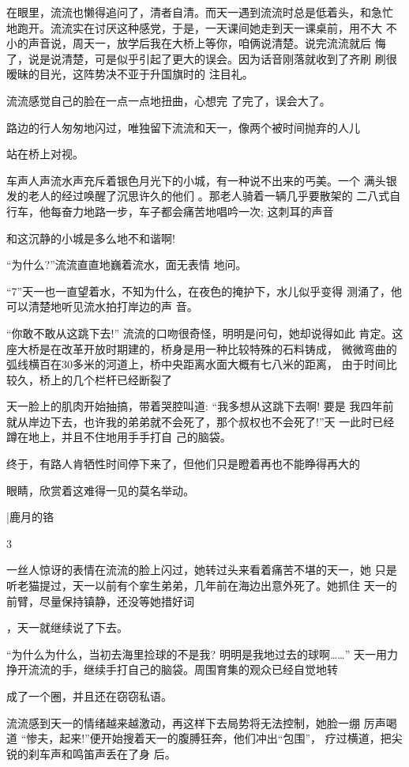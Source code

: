 \documentclass{article}
\begin{document}
在眼里，流流也懒得追问了，清者自清。而天一遇到流流时总是低着头，和急忙
地跑开。流流实在讨厌这种感党，于是，一天课间她走到天一课桌前，用不大
不小的声音说，周天一，放学后我在大桥上等你，咱俩说清楚。说完流流就后
悔了，说是说清楚，可是似乎引起了更大的误会。因为话音刚落就收到了齐刷
刷很暧昧的目光，这阵势决不亚于升国旗时的
注目礼。 

流流感觉自己的脸在一点一点地扭曲，心想完
了完了，误会大了。 

路边的行人匆匆地闪过，唯独留下流流和天一，像两个被时间抛弃的人儿

站在桥上对视。 

车声人声流水声充斥着银色月光下的小城，有一种说不出来的丐美。一个
满头银发的老人的经过唤醒了沉思许久的他们
\newpage
。那老人骑着一辆几乎要散架的
二八式自行车，他每奋力地路一步，车子都会痛苦地唱吟一次; 这刺耳的声音

和这沉静的小城是多么地不和谐啊! 

“为什么?”流流直直地巍着流水，面无表情
地问。 

“7”天一也一直望着水，不知为什么，在夜色的掩护下，水儿似乎变得
测涌了，他可以清楚地听见流水拍打岸边的声
音。 

“你敢不敢从这跳下去!” 流流的口吻很奇怪，明明是问句，她却说得如此
肯定。这座大桥是在改革开放时期建的，桥身是用一种比较特殊的石料铸成，
微微弯曲的弧线横百在30多米的河道上，桥中央距离水面大概有七八米的距离，
由于时间比较久，桥上的几个栏杆已经断裂了

\newpage

天一脸上的肌肉开始抽搞，带着哭腔叫道: “我多想从这跳下去啊! 要是
我四年前就从岸边下去，也许我的弟弟就不会死了，那个叔权也不会死了!”天
一此时已经蹲在地上，并且不住地用手手打自
己的脑袋。 

终于，有路人肯牺性时间停下来了，但他们只是瞪着再也不能睁得再大的

眼睛，欣赏着这难得一见的莫名举动。 


|鹿月的铬

3 

一丝人惊讶的表情在流流的脸上闪过，她转过头来看着痛苦不堪的天一，她
只是听老猫提过，天一以前有个挛生弟弟，几年前在海边出意外死了。她抓住
天一的前臂，尽量保持镇静，还没等她措好词

\newpage
，天一就继续说了下去。 

“为什么为什么，当初去海里捡球的不是我? 明明是我地过去的球啊……”
天一用力挣开流流的手，继续手打自己的脑袋。周围育集的观众已经自觉地转

成了一个圈，并且还在窃窃私语。 

流流感到天一的情绪越来越激动，再这样下去局势将无法控制，她脸一绷
厉声喝道 “惨夫，起来!”便开始搜着天一的腹膊狂奔，他们冲出“包围”，
疗过横道，把尖锐的刹车声和鸣笛声丢在了身
后。 
\end{document}
